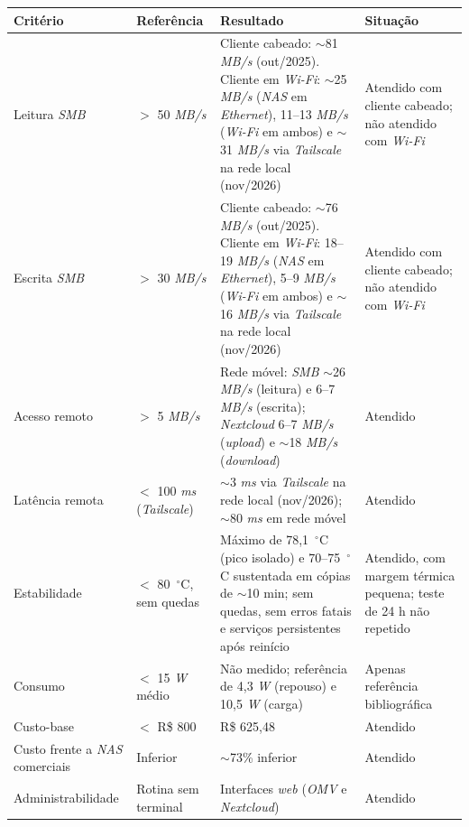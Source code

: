 \begin{quadro}[H]
    \centering
    \footnotesize
    \renewcommand{\arraystretch}{1.1}
    \begin{tabularx}{\linewidth}{|>{\raggedright\arraybackslash}X|>{\raggedright\arraybackslash}X|>{\raggedright\arraybackslash}X|>{\raggedright\arraybackslash}X|}
        \hline
        \textbf{Critério} & \textbf{Referência} & \textbf{Resultado} & \textbf{Situação} \\
        \hline
        \hline
        Leitura \textit{SMB} & $>$ 50 \textit{MB/s} & Cliente cabeado: $\sim$81 \textit{MB/s} (out/2025). Cliente em \textit{Wi-Fi}: $\sim$25 \textit{MB/s} (\textit{NAS} em \textit{Ethernet}), 11--13 \textit{MB/s} (\textit{Wi-Fi} em ambos) e $\sim$31 \textit{MB/s} via \textit{Tailscale} na rede local (nov/2026) & Atendido com cliente cabeado; não atendido com \textit{Wi-Fi} \\
        \hline
        Escrita \textit{SMB} & $>$ 30 \textit{MB/s} & Cliente cabeado: $\sim$76 \textit{MB/s} (out/2025). Cliente em \textit{Wi-Fi}: 18--19 \textit{MB/s} (\textit{NAS} em \textit{Ethernet}), 5--9 \textit{MB/s} (\textit{Wi-Fi} em ambos) e $\sim$16 \textit{MB/s} via \textit{Tailscale} na rede local (nov/2026) & Atendido com cliente cabeado; não atendido com \textit{Wi-Fi} \\
        \hline
        Acesso remoto & $>$ 5 \textit{MB/s} & Rede móvel: \textit{SMB} $\sim$26 \textit{MB/s} (leitura) e 6--7 \textit{MB/s} (escrita); \textit{Nextcloud} 6--7 \textit{MB/s} (\textit{upload}) e $\sim$18 \textit{MB/s} (\textit{download}) & Atendido \\
        \hline
        Latência remota & $<$ 100 \textit{ms} (\textit{Tailscale}) & $\sim$3 \textit{ms} via \textit{Tailscale} na rede local (nov/2026); $\sim$80 \textit{ms} em rede móvel & Atendido \\
        \hline
        Estabilidade & $<$ 80~$^\circ$C, sem quedas & Máximo de 78,1~$^\circ$C (pico isolado) e 70--75~$^\circ$C sustentada em cópias de $\sim$10 min; sem quedas, sem erros fatais e serviços persistentes após reinício & Atendido, com margem térmica pequena; teste de 24 h não repetido \\
        \hline
        Consumo & $<$ 15 \textit{W} médio & Não medido; referência de 4,3 \textit{W} (repouso) e 10,5 \textit{W} (carga) & Apenas referência bibliográfica \\
        \hline
        Custo-base & $<$ R\$ 800 & R\$ 625,48 & Atendido \\
        \hline
        Custo frente a \textit{NAS} comerciais & Inferior & $\sim$73\% inferior & Atendido \\
        \hline
        Administrabilidade & Rotina sem terminal & Interfaces \textit{web} (\textit{OMV} e \textit{Nextcloud}) & Atendido \\
        \hline
    \end{tabularx}
    \vspace{0.2cm}
    \fonteautoria
\end{quadro}

\begin{figure}[H]
    \centering
\end{figure}
